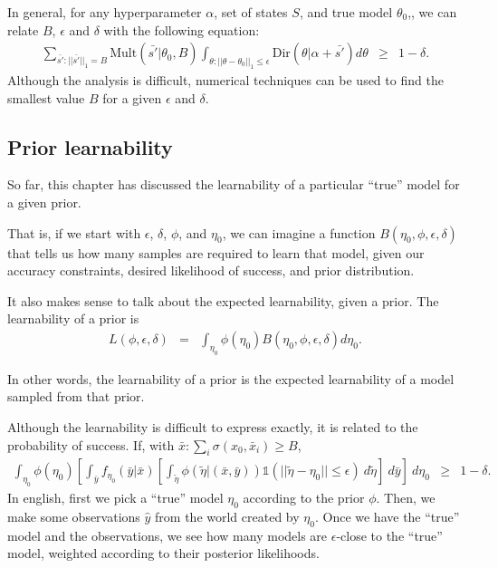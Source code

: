 In general, for any hyperparameter $\alpha$, set of states $S$, and true model $\theta_0$,, we can relate $B$, $\epsilon$ and $\delta$ with the following equation:
\begin{eqnarray}
\sum_{\bar {s'}:||\bar {s'}||_1 = B} \limits
 \mbox{Mult}(\bar {s'}|\theta_0,B)
 \int_{\theta:||\theta-\theta_0||_1 \leq \epsilon}\limits
  \mbox{Dir}(\theta|\alpha+\bar{s'})
  d\theta
&\geq& 1-\delta.
\end{eqnarray}
Although the analysis is difficult, numerical techniques can be used to find the smallest value $B$ for a given $\epsilon$ and $\delta$.

\subsection{Prior learnability}

So far, this chapter has discussed the learnability of a particular ``true'' model for a given prior.

That is, if we start with $\epsilon$, $\delta$, $\phi$, and $\eta_0$, we can imagine a function $B(\eta_0,\phi,\epsilon,\delta)$ that tells us how many samples are required to learn that model, given our accuracy constraints, desired likelihood of success, and prior distribution. 

It also makes sense to talk about the expected learnability, given a prior. The learnability of a prior is
\begin{eqnarray}
L(\phi,\epsilon,\delta)
&=&
\int_{\eta_0} \phi(\eta_0) B(\eta_0,\phi,\epsilon,\delta) d\eta_0.
\end{eqnarray}

In other words, the learnability of a prior is the expected learnability of a model sampled from that prior.

Although the learnability is difficult to express exactly, it is related to the probability of success. If, with $\bar x:\sum_i \sigma(x_0,{\bar x}_i)\geq B$,
\begin{eqnarray}
\label{sec:guarantees:prior-learnability}
\int_{\eta_0}\limits
 \phi(\eta_0) \left[
 \int_{\bar y} \limits
  f_{\eta_0}(\bar y|\bar x) \left[
  \int_{\tilde\eta}\limits
   \phi(\tilde\eta|(\bar x, \bar y))
   \mathbb{1}(||\tilde\eta-\eta_0||\leq\epsilon)
  \ d\tilde\eta \right]
 \ d\bar y \right]
\ d\eta_0
&\geq&
1-\delta.
\end{eqnarray}
In english, first we pick a ``true'' model $\eta_0$ according to the prior $\phi$. Then, we make some observations $\hat y$ from the world created by $\eta_0$. Once we have the ``true'' model and the observations, we see how many models are $\epsilon$-close to the ``true'' model, weighted according to their posterior likelihoods.


